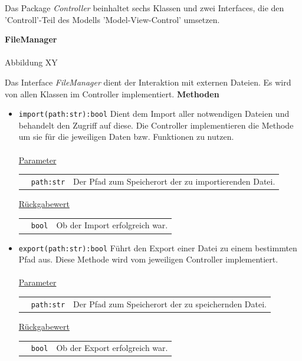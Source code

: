 \documentclass{article}
\begin{document}
Das Package \textit{Controller} beinhaltet sechs Klassen und zwei Interfaces, die den 'Controll'-Teil des Modells 'Model-View-Control' umsetzen.

\newpage
\textbf{\large{FileManager}}\\\\
Abbildung XY

Das Interface \textit{FileManager} dient der Interaktion mit externen Dateien. Es wird von allen Klassen im Controller implementiert.
\newline \newline
\textbf{{Methoden}}
\begin{itemize}
\item \texttt{import(path:str):bool} \newline Dient dem Import aller notwendigen Dateien und behandelt den Zugriff auf diese. Die Controller implementieren die Methode um sie für die jeweiligen Daten bzw. Funktionen zu nutzen.
\\\\
\underline{{Parameter}}

\begin{tabular}{lll}
 & \texttt{path:str} & Der Pfad zum Speicherort der zu importierenden Datei. \\
\end{tabular}

\underline{{Rückgabewert}}

\begin{tabular}{lll}
 & \texttt{bool} & Ob der Import erfolgreich war. \\
\end{tabular}


\item \texttt{export(path:str):bool} \newline Führt den Export einer Datei zu einem bestimmten Pfad aus. Diese Methode wird vom jeweiligen Controller implementiert.
\\\\
\underline{{Parameter}}

\begin{tabular}{lll}
 & \texttt{path:str} & Der Pfad zum Speicherort der zu speichernden Datei. \\
\end{tabular}

\underline{{Rückgabewert}}

\begin{tabular}{lll}
 & \texttt{bool} & Ob der Export erfolgreich war. \\
\end{tabular}
\end{itemize}
\end{document}
